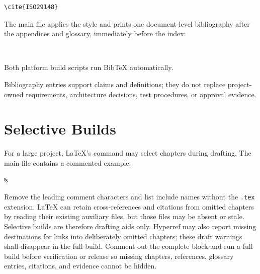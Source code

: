 \begin{verbatim}
\cite{ISO29148}
\end{verbatim}

The main file applies the style and prints one document-level bibliography after the appendices and glossary, immediately before the index:

\begin{verbatim}


\end{verbatim}

Both platform build scripts run BibTeX automatically.

Bibliography entries support claims and definitions; they do not replace
project-owned requirements, architecture decisions, test procedures, or
approval evidence.

\section{Selective Builds}

For a large project, LaTeX's \verb|| command may select chapters
during drafting. The main file contains a commented example:

\begin{verbatim}
% 
\end{verbatim}

Remove the leading comment characters and list include names without the
\texttt{.tex} extension. LaTeX can retain cross-references and citations from
omitted chapters by reading their existing auxiliary files, but those files
may be absent or stale. Selective builds are therefore drafting aids only.
Hyperref may also report missing destinations for links into deliberately
omitted chapters; these draft warnings shall disappear in the full build.
Comment out the complete \verb|| block and run a full build before
verification or release so missing chapters, references, glossary entries,
citations, and evidence cannot be hidden.
